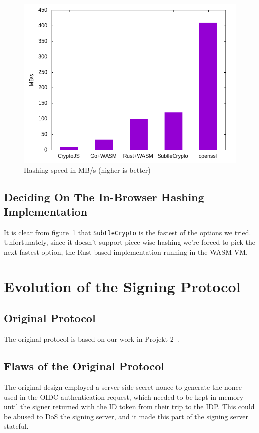 \begin{figure}
    \begin{center}
        \includegraphics[width=0.7\linewidth]{images/hashingperformance.png}
        \caption{Hashing speed in MB/s (higher is better)}
        \label{fig:hashingperformance}
    \end{center}
\end{figure}


\subsection{Deciding On The In-Browser Hashing Implementation}
\label{subsec:deciding-on-the-in-browser-hashing-implementation}
It is clear from figure~\ref{fig:hashingperformance} that \texttt{SubtleCrypto} is the fastest of the options we tried.
Unfortunately, since it doesn't support piece-wise hashing we're forced to pick the next-fastest option,
the Rust-based implementation running in the \gls{WASM} \gls{VM}.

\section{Evolution of the Signing Protocol}
\label{sec:signingprotocol}

\subsection{Original Protocol}\label{subsec:original-protocol}
The original protocol is based on our work in Projekt 2~\cite{projekt2}.

\subsection{Flaws of the Original Protocol}\label{subsec:flaws-of-the-original-protocol}
The original design employed a server-side secret nonce to generate the nonce used in the \gls{OIDC} authentication request,
which needed to be kept in memory until the signer returned with the ID token from their trip to the \gls{IDP}.
This could be abused to \gls{DoS} the signing server, and it made this part of the signing server stateful.

